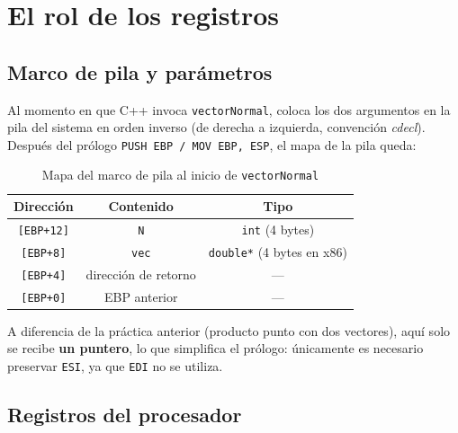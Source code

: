 \documentclass[12pt, letterpaper]{article}
\begin{document}
\section{El rol de los registros}

\subsection{Marco de pila y parámetros}

Al momento en que C++ invoca \texttt{vectorNormal}, coloca los dos argumentos en la pila del sistema en orden inverso (de derecha a izquierda, convención \textit{cdecl}). Después del prólogo \texttt{PUSH EBP / MOV EBP, ESP}, el mapa de la pila queda:

\begin{table}[H]
    \centering
    \begin{tabular}{@{}ccc@{}}
        \toprule
        \textbf{Dirección} & \textbf{Contenido} & \textbf{Tipo} \\
        \midrule
        \texttt{[EBP+12]} & \texttt{N}     & \texttt{int} (4 bytes) \\
        \texttt{[EBP+8]}  & \texttt{vec}   & \texttt{double*} (4 bytes en x86) \\
        \texttt{[EBP+4]}  & dirección de retorno & — \\
        \texttt{[EBP+0]}  & EBP anterior   & — \\
        \bottomrule
    \end{tabular}
    \caption{Mapa del marco de pila al inicio de \texttt{vectorNormal}}
\end{table}

A diferencia de la práctica anterior (producto punto con dos vectores), aquí solo se recibe \textbf{un puntero}, lo que simplifica el prólogo: únicamente es necesario preservar \texttt{ESI}, ya que \texttt{EDI} no se utiliza.

\subsection{Registros del procesador}
\end{document}
